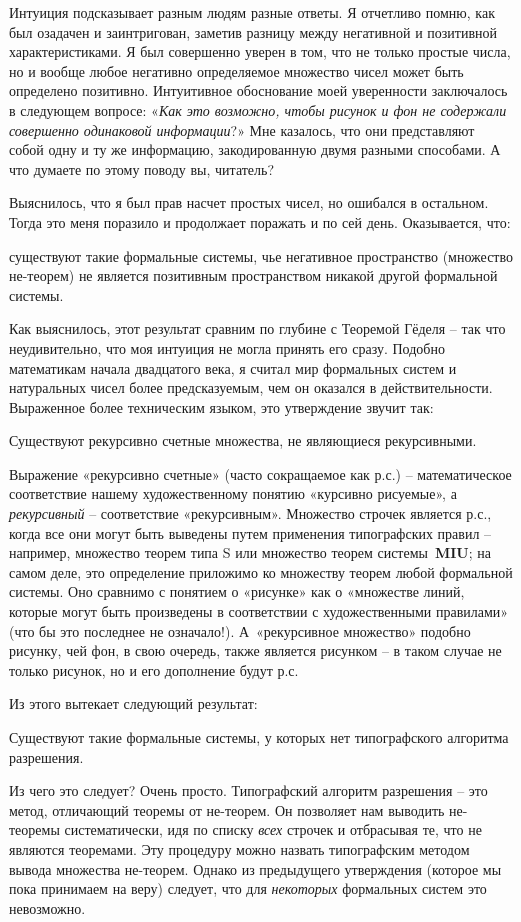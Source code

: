 \documentclass[../main.tex]{subfiles}
\begin{document}
Интуиция подсказывает разным людям разные ответы.
Я отчетливо помню, как был озадачен и заинтригован, заметив разницу между негативной и позитивной характеристиками.
Я был совершенно уверен в том, что не только простые числа, но и вообще любое негативно определяемое множество чисел может быть определено позитивно.
Интуитивное обоснование моей уверенности заключалось в следующем вопросе: «\emph{Как это возможно, чтобы рисунок и фон не содержали совершенно одинаковой информации}?»
Мне казалось, что они представляют собой одну и ту же информацию, закодированную двумя разными способами.
А что думаете по этому поводу вы, читатель?

Выяснилось, что я был прав насчет простых чисел, но ошибался в остальном. Тогда это меня поразило и продолжает поражать и по сей день.
Оказывается, что:
%
\begin{block}
    существуют такие формальные системы, чье негативное пространство (множество не-теорем) не является позитивным пространством никакой другой формальной системы.
\end{block}

Как выяснилось, этот результат сравним по глубине с Теоремой Гёделя \--- так что неудивительно, что моя интуиция не могла принять его сразу.
Подобно математикам начала двадцатого века, я считал мир формальных систем и натуральных чисел более предсказуемым, чем он оказался в действительности.
Выраженное более техническим языком, это утверждение звучит так:
%
\begin{block}
    Существуют рекурсивно счетные множества, не являющиеся рекурсивными.
\end{block}

Выражение «рекурсивно счетные» (часто сокращаемое как р.с.) \--- математическое соответствие нашему художественному понятию «курсивно рисуемые», а \emph{рекурсивный} \--- соответствие «рекурсивным».
Множество строчек является р.с., когда все они могут быть выведены путем применения типографских правил \--- например, множество теорем типа S или множество теорем системы~\textbf{MIU}; на самом деле, это определение приложимо ко множеству теорем любой формальной системы.
Оно сравнимо с понятием о «рисунке» как о «множестве линий, которые могут быть произведены в соответствии с художественными правилами» (что бы это последнее не означало!).
А~«рекурсивное множество» подобно рисунку, чей фон, в свою очередь, также является рисунком \--- в таком случае не только рисунок, но и его дополнение будут р.с.

Из этого вытекает следующий результат:
%
\begin{block}
    Существуют такие формальные системы, у которых нет типографского алгоритма разрешения.
\end{block}
%
Из чего это следует?
Очень просто.
Типографский алгоритм разрешения \--- это метод, отличающий теоремы от не-теорем.
Он позволяет нам выводить не-теоремы систематически, идя по списку \emph{всех} строчек и отбрасывая те, что не являются теоремами.
Эту процедуру можно назвать типографским методом вывода множества не-теорем.
Однако из предыдущего утверждения (которое мы пока принимаем на веру) следует, что для \emph{некоторых} формальных систем это невозможно.
\end{document}
